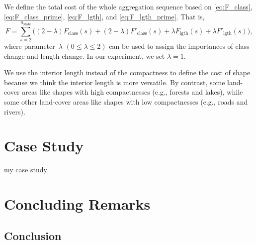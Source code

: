 \documentclass[ijgi,article,submit,moreauthors,pdftex]{Definitions/mdpi}
\begin{document}
We define the total cost of the whole aggregation sequence
based on \eqs\ref{eq:F_class}, \ref{eq:F_class_prime}, 
\ref{eq:F_lgth}, and \ref{eq:F_lgth_prime}. 
That is,
\begin{equation}
\label{eq:F}
F = \sum_{s=2}^{n_\mathrm{state}}
        \bigg(
            (2-\lambda)F_\mathrm{class}(s) +
            (2-\lambda)F'_\mathrm{class}(s) + 
            \lambda F_\mathrm{lgth}(s) +
            \lambda F'_\mathrm{lgth}(s)
        \bigg),
\end{equation}
where parameter~$\lambda$ $(0\le \lambda \le 2)$ can be used to assign the importances of 
class change and length change.
In our experiment, we set $\lambda=1$.

We use the interior length instead of the compactness to define the cost of shape
because we think the interior length is more versatile.
By contrast, some land-cover areas like shapes with high compactnesses 
(e.g., forests and lakes),
while some other land-cover areas like shapes with low compactnesses 
(e.g., roads and rivers).






\section{Case Study}
\label{sec:case_study}


my case study





\section{Concluding Remarks}
\label{sec:concluding_remarks}

\subsection{Conclusion}
\end{document}
